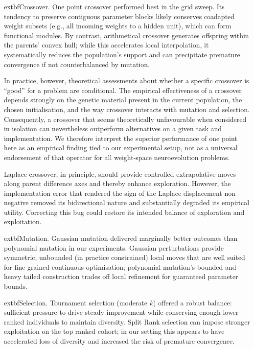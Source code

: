 \documentclass[12pt, a4paper]{article}
\begin{document}
	extbf{Crossover.} One point crossover performed best in the grid sweep. Its tendency to preserve contiguous parameter blocks likely conserves coadapted weight subsets (e.g., all incoming weights to a hidden unit), which can form functional modules. By contrast, arithmetical crossover generates offspring within the parents' convex hull; while this accelerates local interpolation, it systematically reduces the population's support and can precipitate premature convergence if not counterbalanced by mutation.

In practice, however, theoretical assessments about whether a specific crossover is ``good'' for a problem are conditional. The empirical effectiveness of a crossover depends strongly on the genetic material present in the current population, the chosen initialisation, and the way crossover interacts with mutation and selection. Consequently, a crossover that seems theoretically unfavourable when considered in isolation can nevertheless outperform alternatives on a given task and implementation. We therefore interpret the superior performance of one point here as an empirical finding tied to our experimental setup, not as a universal endorsement of that operator for all weight-space neuroevolution problems.

Laplace crossover, in principle, should provide controlled extrapolative moves along parent difference axes and thereby enhance exploration. However, the implementation error that rendered the sign of the Laplace displacement non negative removed its bidirectional nature and substantially degraded its empirical utility. Correcting this bug could restore its intended balance of exploration and exploitation.

	extbf{Mutation.} Gaussian mutation delivered marginally better outcomes than polynomial mutation in our experiments. Gaussian perturbations provide symmetric, unbounded (in practice constrained) local moves that are well suited for fine grained continuous optimisation; polynomial mutation's bounded and heavy tailed construction trades off local refinement for guaranteed parameter bounds.

	extbf{Selection.} Tournament selection (moderate $k$) offered a robust balance: sufficient pressure to drive steady improvement while conserving enough lower ranked individuals to maintain diversity. Split Rank selection can impose stronger exploitation on the top ranked cohort; in our setting this appears to have accelerated loss of diversity and increased the risk of premature convergence.
\end{document}

